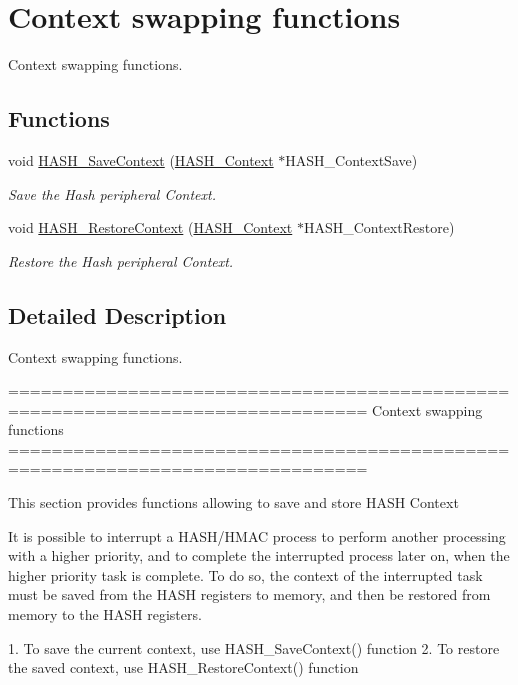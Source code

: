 \hypertarget{group___h_a_s_h___group3}{}\section{Context swapping functions}
\label{group___h_a_s_h___group3}


Context swapping functions.  


\subsection*{Functions}
\begin{DoxyCompactItemize}
\item 
void \hyperlink{group___h_a_s_h___group3_ga9432b2b66e223414c840e9313c388bc5}{H\+A\+S\+H\+\_\+\+Save\+Context} (\hyperlink{struct_h_a_s_h___context}{H\+A\+S\+H\+\_\+\+Context} $\ast$H\+A\+S\+H\+\_\+\+Context\+Save)
\begin{DoxyCompactList}\small\item\em Save the Hash peripheral Context. \end{DoxyCompactList}\item 
void \hyperlink{group___h_a_s_h___group3_ga1d8412a13601376c968aec63212ca54e}{H\+A\+S\+H\+\_\+\+Restore\+Context} (\hyperlink{struct_h_a_s_h___context}{H\+A\+S\+H\+\_\+\+Context} $\ast$H\+A\+S\+H\+\_\+\+Context\+Restore)
\begin{DoxyCompactList}\small\item\em Restore the Hash peripheral Context. \end{DoxyCompactList}\end{DoxyCompactItemize}


\subsection{Detailed Description}
Context swapping functions. 

\begin{DoxyVerb} ===============================================================================
                             Context swapping functions
 ===============================================================================  

  This section provides functions allowing to save and store HASH Context
  
  It is possible to interrupt a HASH/HMAC process to perform another processing 
  with a higher priority, and to complete the interrupted process later on, when 
  the higher priority task is complete. To do so, the context of the interrupted 
  task must be saved from the HASH registers to memory, and then be restored 
  from memory to the HASH registers.
  
  1. To save the current context, use HASH_SaveContext() function
  2. To restore the saved context, use HASH_RestoreContext() function \end{DoxyVerb}
 

